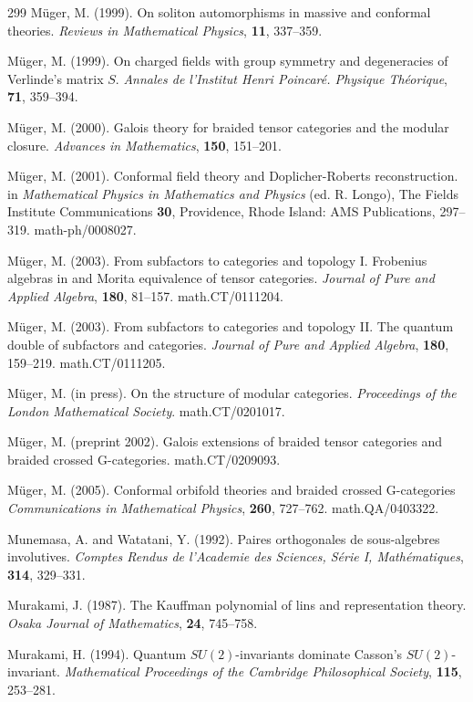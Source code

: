\documentclass[12pt]{article}
\theoremstyle{plain}
\theoremstyle{definition}
\numberwithin{equation}{section}
\begin{document}
\begin{thebibliography} {299}
M\"uger, M. (1999). On soliton automorphisms in massive and conformal theories.
{\em Reviews in Mathematical Physics}, {\bf 11}, 337--359.

M\"uger, M. (1999). On charged fields with group symmetry and degeneracies of Verlinde's
matrix $S$. {\em Annales de l'Institut Henri Poincar\'e. Physique Th\'eorique},
{\bf 71}, 359--394.

M\"uger, M. (2000). Galois theory for braided tensor categories and the modular closure.
{\em Advances in Mathematics}, {\bf 150}, 151--201.

M\"uger, M. (2001). Conformal field theory and Doplicher-Roberts reconstruction.
in {\em Mathematical Physics in Mathematics and Physics} (ed. R. Longo),
The Fields Institute Communications {\bf 30}, Providence, Rhode Island:
AMS Publications, 297--319. math-ph/0008027.

M\"uger, M. (2003). From subfactors to categories and topology I.
Frobenius algebras in and Morita equivalence of tensor categories.
{\em Journal of Pure and Applied Algebra}, {\bf 180}, 81--157. math.CT/0111204.

M\"uger, M. (2003). From subfactors to categories and topology II.
The quantum double of subfactors and categories.
{\em Journal of Pure and Applied Algebra}, {\bf 180}, 159--219. math.CT/0111205.

M\"uger, M. (in press).
On the structure of modular categories. {\em Proceedings of the London Mathematical Society}. math.CT/0201017.

M\"uger, M. (preprint 2002). Galois extensions of braided tensor categories and
braided crossed G-categories. math.CT/0209093.

M\"uger, M. (2005). Conformal orbifold theories and braided crossed G-categories
{\em Communications in Mathematical Physics}, {\bf 260}, 727--762. math.QA/0403322.

Munemasa, A. and Watatani, Y. (1992). Paires orthogonales de sous-algebres involutives.
{\em Comptes Rendus de l'Academie des Sciences,
S\'erie I, Math\'ematiques}, {\bf 314}, 329--331.

Murakami, J. (1987). The Kauffman polynomial of lins and representation theory.
{\em Osaka Journal of Mathematics}, {\bf 24}, 745--758.

Murakami, H. (1994). Quantum $SU(2)$-invariants dominate Casson's
$SU(2)$-invariant. {\em Mathematical Proceedings of the Cambridge Philosophical Society},
{\bf 115}, 253--281.


\end{thebibliography}
\end{document}

